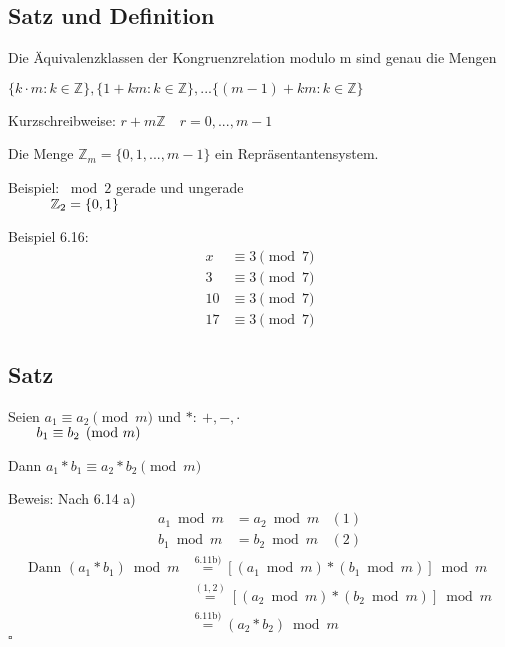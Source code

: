 \documentclass[a4paper, 12pt, twoside] {article}
\begin{document}
\subsection[Satz und Definition (Äquivalenzklassen, Kongruenzrelation, \newline Repräsentantensysteme)]{Satz und Definition} %

Die Äquivalenzklassen der Kongruenzrelation modulo m sind genau die Mengen

$\{k \cdot m : k \in \mathbb{Z}\}, \{1 + km : k \in \mathbb{Z}\}, ... \{(m-1)+km : k \in \mathbb{Z}\}$

Kurzschreibweise: $r+m \mathbb{Z} \quad r=0, ..., m-1$

Die Menge $\mathbb{Z}_m = \{0,1,...,m-1\}$ ein Repräsentantensystem.

Beispiel: $\bmod 2$ gerade und ungerade \\
$\text{\qquad \quad}\mathbb{Z}_2 = \{0,1\}$

Beispiel 6.16: 
\begin{align*}
x &\equiv 3 \pmod 7 \\
3 &\equiv 3 \pmod 7 \\
10 &\equiv 3 \pmod 7 \\
17 &\equiv 3 \pmod 7
\end{align*}

\subsection[Satz (Eigenschaften der Kongruenzrelation)]{Satz} %

Seien $a_1 \equiv a_2 \pmod m$ und $*:\ +,-,\cdot$ \\
$\text{\qquad} b_1 \equiv b_2 \pmod m$
	
Dann $a_1 * b_1 \equiv a_2 * b_2 \pmod m$
	
Beweis:	Nach 6.14 a)
\begin{align*}
a_1 \bmod m &= a_2 \bmod m & (1) \\
b_1 \bmod m &= b_2 \bmod m & (2)
\end{align*}
\begin{align*}
\text{Dann } (a_1 * b_1) \bmod m &\overset{\text{6.11b)}}{=} [(a_1 \bmod m) * (b_1 \bmod m) ] \bmod m \\
&\overset{(1,2)}{=}  [(a_2 \bmod m) * (b_2 \bmod m)] \bmod m \\
&\overset{\text{6.11b)}}{=} (a_2 * b_2) \bmod m
\end{align*}
\hfill $\square$
\end{document}
